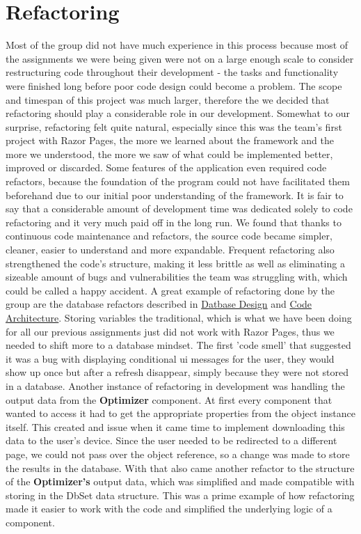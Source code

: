 \documentclass[12pt]{report}
\begin{document}
\section{Refactoring}

Most of the group did not have much experience in this process because most of the assignments we were being given
were not on a large enough scale to consider restructuring code throughout their development - the tasks and functionality
were finished long before poor code design could become a problem.
The scope and timespan of this project was much larger, therefore the we decided that refactoring should play a considerable
role in our development. Somewhat to our surprise, refactoring felt quite natural, especially since this was the team's first
project with Razor Pages, the more we learned about the framework and the more we understood, the more we saw of what 
could be implemented better, improved or discarded. Some features of the application even required code refactors, because the
foundation of the program could not have facilitated them beforehand due to our initial poor understanding of the framework.
It is fair to say that a considerable amount of development time was dedicated solely to code refactoring and it very much 
paid off in the long run. We found that thanks to continuous code maintenance and refactors, the source code became simpler, cleaner,
easier to understand and more expandable. Frequent refactoring also strengthened the code's structure, making it less brittle as well
as eliminating a sizeable amount of bugs and vulnerabilities the team was struggling with, which could be called a happy accident.
A great example of refactoring done by the group are the database refactors described in \hyperref[sec:database]{Datbase Design}
and \hyperref[sec:code]{Code Architecture}. Storing variables the traditional, which is what we have been doing for all our previous
assignments just did not work with Razor Pages, thus we needed to shift more to a database mindset. The first 'code smell' that suggested
it was a bug with displaying conditional ui messages for the user, they would show up once but after a refresh disappear, simply because
they were not stored in a database.
Another instance of refactoring in development was handling the output data from the \textbf{Optimizer} component. At first
every component that wanted to access it had to get the appropriate properties from the object instance itself. This created and issue
when it came time to implement downloading this data to the user's device. Since the user needed to be redirected to a different page,
we could not pass over the object reference, so a change was made to store the results in the database. With that also came another
refactor to the structure of the \textbf{Optimizer's} output data, which was simplified and made compatible with storing in the DbSet
data structure. This was a prime example of how refactoring made it easier to work with the code and simplified the underlying
logic of a component.
\end{document}
